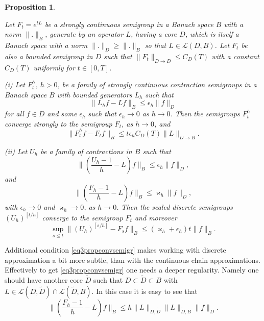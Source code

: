 \documentclass[12pt]{article}
\def\LC{\mathcal{L}}
\def\ep{\epsilon}
\def\ka{\varkappa}
\newtheorem{prop}{Proposition}[section]
\begin{document}
\begin{prop}
\label{propconvsemigr}

 Let $F_t=e^{tL}$ be a strongly continuous semigroup in a Banach space $B$ with a norm $\|.\|_B$,
 generate by an operator $L$,
having a core $D$, which is itself a Banach space with a norm $\|.\|_D\ge \|.\|_B$ so that $L\in \LC(D,B)$.
Let $F_t$ be also a bounded semigroup in $D$
such that $\|F_t\|_{D\to D} \le C_D(T)$ with a constant $C_D(T)$ uniformly for $t\in [0,T]$.

(i) Let $F_t^h$, $h>0$,  be a family of strongly continuous contraction semigroups in a Banach space $B$
with bounded generators $L_h$ such that
\[
\|L_hf-Lf\|_B \le \ep_h \|f\|_D
\]
for all $f\in D$ and some $\ep_h$ such that $\ep_h\to 0$ as $h\to 0$.
 Then the semigroups $F_t^h$ converge strongly to the semigroup $F_t$, as $h\to 0$, and
\begin{equation}
\label{eq1propconvsemigr}
\|F_t^hf -F_tf\|_B \le t \ep_h C_D(T)\|L\|_{D\to B}.
\end{equation}

(ii) Let $U_h$ be a family of contractions in $B$ such that
\begin{equation}
\label{eq2propconvsemigr}
\|\left(\frac{U_h-1}{h} -L\right)f\|_B \le \ep_h \|f\|_D,
\end{equation}
and
 \begin{equation}
\label{eq3propconvsemigr}
\|\left(\frac{F_h-1}{h} -L\right)f\|_B \le \ka_h \|f\|_D,
\end{equation}
with $\ep_h \to 0$ and $\ka_h\to 0$, as $h\to 0$.
Then the scaled discrete semigroups $(U_h)^{[t/h]}$ converge to the semigroup $F_t$
and moreover
 \begin{equation}
\label{eq4propconvsemigr}
\sup_{s\le t}\|(U_h)^{[s/h]} -F_sf\|_B \le (\ka_h+\ep_h)t \|f\|_B.
\end{equation}
\end{prop}

Additional condition \eqref{eq3propconvsemigr} makes working with discrete approximation a bit more subtle,
than with the continuous chain approximations. Effectively to get \eqref{eq3propconvsemigr}
one needs a deeper regularity. Namely one should have another core $\tilde D$ such that $D\subset \tilde D\subset B$
with $L\in \LC(D,\tilde D) \cap \LC(\tilde D,B)$. In this case it is easy to see that
\begin{equation}
\label{eq5propconvsemigr}
\|\left(\frac{F_h-1}{h} -L\right)f\|_B \le h \|L\|_{D,\tilde D} \|L\|_{\tilde D,B}\|f\|_D.
\end{equation}
\end{document}

